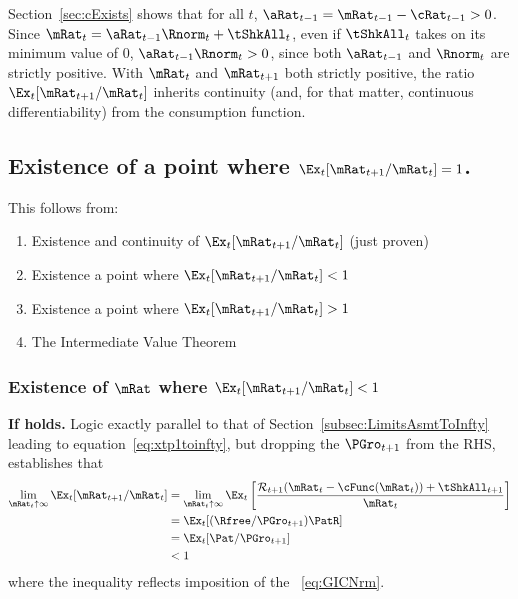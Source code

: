 \documentclass[\econtexRoot/BufferStockTheory]{subfiles}
\begin{document}
Section~\ref{sec:cExists} shows that for all $t$, $\aRat_{t-1} = {\mRat}_{t-1} -  \cRat_{t-1} > 0$.  Since ${\mRat}_{t}= {\aRat}_{t-1} \Rnorm_{t} + \tShkAll_{t}$, even if $\tShkAll_{t}$ takes on its minimum value of 0, $\aRat_{t-1} \Rnorm_{t} > 0$, since both $\aRat_{t-1}$ and $\Rnorm_{t}$ are strictly positive.  With $\mRat_{t}$ and $\mRat_{t+1}$ both strictly positive, the ratio $\Ex_t [{\mRat}_{t+1}/\mRat_t]$ inherits continuity (and, for that matter, continuous differentiability) from the consumption function.

\subsection{Existence of a point where
  \texorpdfstring{$\Ex_t [{\mRat}_{t+1}/\mRat_t]=1$}
  {Ex-t[mRat-{t+1}/mRat-{t}]=1}.}

This follows from:
\begin{enumerate}
\item Existence and continuity of $\Ex_t [{\mRat}_{t+1}/\mRat_t]$ (just proven)
  \item Existence a point where $\Ex_t [{\mRat}_{t+1}/\mRat_t] < 1$
  \item Existence a point where $\Ex_t [{\mRat}_{t+1}/\mRat_t] > 1$
    \item The Intermediate Value Theorem
    \end{enumerate}

\subsubsection{Existence of \texorpdfstring{$\mRat$}{m} where \texorpdfstring{$\Ex_t [{\mRat}_{t+1}/\mRat_t] < 1$}{E[m{t+1}/m{t}}}
    
\textbf{If {\RIC} holds.}  Logic exactly parallel to that of Section~\ref{subsec:LimitsAsmtToInfty} leading to equation~\eqref{eq:xtp1toinfty}, but dropping the $\PGro_{t+1}$ from the RHS, establishes that
\begin{align}
  \lim_{\mRat_{t} \uparrow \infty} \Ex_{t}[{\mRat}_{t+1}/\mRat_{t}]  & =   
                                                                       \lim_{\mRat_{t} \uparrow \infty} 
                                                                       \Ex_{t}\left[\frac{{\mathcal{\mathcal{R}}}_{t+1}(\mRat_{t}-\cFunc(\mRat_{t}))+{\tShkAll}_{t+1}}{\mRat_{t}}\right] \notag 
  \\  & = \Ex_{t}[(\Rfree/{\PGro}_{t+1})\PatR]  \notag
  \\  & = \Ex_{t}[{\Pat}/{\PGro}_{t+1}]  \label{eq:emgro}
  \\  & < 1 \notag
\end{align}
where the inequality reflects imposition of the \GICNrm~\eqref{eq:GICNrm}.
\end{document}
